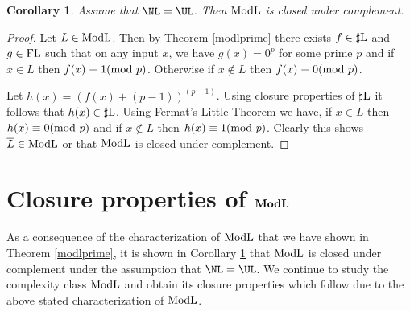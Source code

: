 \documentclass{amsbook}
\newtheorem{corollary}[theorem]{Corollary}
\theoremstyle{definition}
\theoremstyle{remark}
\numberwithin{section}{chapter}
\numberwithin{equation}{chapter}
\newcommand{\sharpL}{\mbox{$\sharp$\rm L}}
\newcommand{\ModL}{\mbox{\rm ModL}}
\newcommand{\boldModL}{\mbox{\rm \bf ModL}}
\newcommand{\FL}{\mbox{\rm FL}}
\renewcommand{\mod}{\mbox{\textrm mod~}}
\begin{document}

\begin{corollary}\label{modlcomplement}
  Assume that $\NL =\UL$. Then $\ModL$ is closed under complement.
\end{corollary}

\begin{proof}
  Let $L\in \ModL$. Then by Theorem \ref{modlprime} there exists $f
  \in \sharpL$ and $g\in \FL$ such that on any input $x$, we have
  $g(x)=0^p$ for some prime $p$ and if $x\in L$ then $f(x)\equiv
  1(\mod p)$. Otherwise if $x\not\in L$ then $f(x)\equiv 0(\mod p)$.

  Let $h(x)=(f(x)+(p-1))^{(p-1)}$. Using closure properties of $\sharpL$ it follows that $h(x)\in \sharpL$. Using Fermat's Little
  Theorem we have, if $x\in L$ then $h(x)\equiv 0(\mod
  p)$ and if $x\not\in L$ then $h(x)\equiv 1(\mod p)$. Clearly this
  shows $\overline{L}\in \ModL$ or that $\ModL$ is closed under
  complement.
\end{proof}

\section{Closure properties of $\boldModL$}\label{chap04-closureModL}
As a consequence of the characterization of $\ModL$ that we have shown in Theorem \ref{modlprime}, it is shown in Corollary \ref{modlcomplement} that $\ModL$ is closed under complement under the assumption that $\NL =\UL$. We continue to study the complexity class $\ModL$ and obtain its closure properties which follow due to the above stated characterization of $\ModL$.
\end{document}
